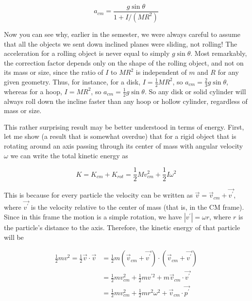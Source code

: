 \documentclass[10pt]{article}
\begin{document}
\begin{equation*}
a_{c m}=\frac{g \sin \theta}{1+I /\left(M R^{2}\right)} \tag{9.40}
\end{equation*}


Now you can see why, earlier in the semester, we were always careful to assume that all the objects we sent down inclined planes were sliding, not rolling! The acceleration for a rolling object is never equal to simply $g \sin \theta$. Most remarkably, the correction factor depends only on the shape of the rolling object, and not on its mass or size, since the ratio of $I$ to $M R^{2}$ is independent of $m$ and $R$ for any given geometry. Thus, for instance, for a disk, $I=\frac{1}{2} M R^{2}$, so $a_{c m}=\frac{2}{3} g \sin \theta$, whereas for a hoop, $I=M R^{2}$, so $a_{c m}=\frac{1}{2} g \sin \theta$. So any disk or solid cylinder will always roll down the incline faster than any hoop or hollow cylinder, regardless of mass or size.

This rather surprising result may be better understood in terms of energy. First, let me show (a result that is somewhat overdue) that for a rigid object that is rotating around an axis passing through its center of mass with angular velocity $\omega$ we can write the total kinetic energy as


\begin{equation*}
K=K_{c m}+K_{r o t}=\frac{1}{2} M v_{c m}^{2}+\frac{1}{2} I \omega^{2} \tag{9.41}
\end{equation*}


This is because for every particle the velocity can be written as $\vec{v}=\vec{v}_{c m}+\overrightarrow{v^{\prime}}$, where $\overrightarrow{v^{\prime}}$ is the velocity relative to the center of mass (that is, in the CM frame). Since in this frame the motion is a simple rotation, we have $\left|v^{\prime}\right|=\omega r$, where $r$ is the particle's distance to the axis. Therefore, the kinetic energy of that particle will be


\begin{align*}
\frac{1}{2} m v^{2}=\frac{1}{2} \vec{v} \cdot \vec{v} & =\frac{1}{2} m\left(\vec{v}_{c m}+\overrightarrow{v^{\prime}}\right) \cdot\left(\vec{v}_{c m}+\overrightarrow{v^{\prime}}\right) \\
& =\frac{1}{2} m v_{c m}^{2}+\frac{1}{2} m v^{\prime 2}+m \vec{v}_{c m} \cdot \overrightarrow{v^{\prime}} \\
& =\frac{1}{2} m v_{c m}^{2}+\frac{1}{2} m r^{2} \omega^{2}+\vec{v}_{c m} \cdot \overrightarrow{p^{\prime}} \tag{9.42}
\end{align*}
\end{document}
